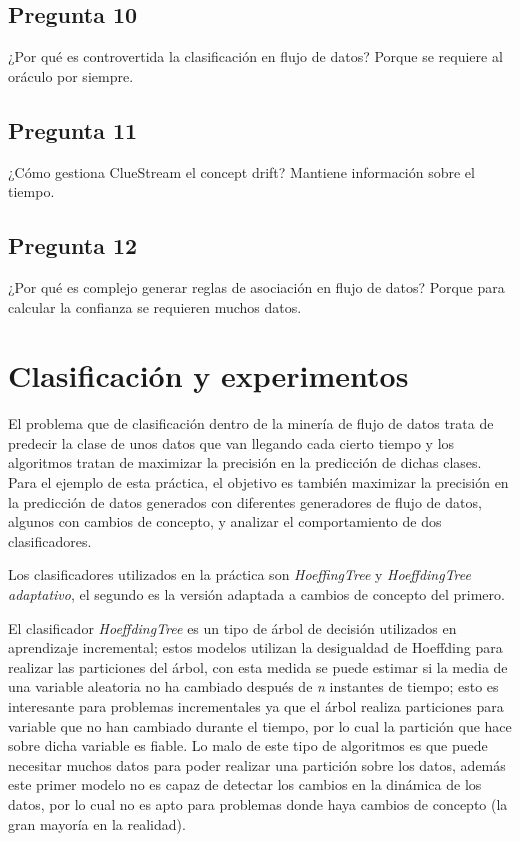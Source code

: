 \subsection{Pregunta 10}
¿Por qué es controvertida la clasificación en flujo de datos? 
Porque se requiere al oráculo por siempre.

\subsection{Pregunta 11}
¿Cómo gestiona ClueStream el concept drift? 
Mantiene información sobre el tiempo.

\subsection{Pregunta 12}
¿Por qué es complejo generar reglas de asociación en flujo de datos?
Porque para calcular la confianza se requieren muchos datos.
\section{Clasificación y experimentos}
El problema que de clasificación dentro de la minería de flujo de datos trata de predecir la clase de unos datos que van llegando cada cierto tiempo y los algoritmos tratan de maximizar la precisión en la predicción de dichas clases. Para el ejemplo de esta práctica, el objetivo es también maximizar la precisión en la predicción de datos generados con diferentes generadores de flujo de datos, algunos con cambios de concepto, y analizar el comportamiento de dos clasificadores.\newline

Los clasificadores utilizados en la práctica son \textit{HoeffingTree} y \textit{HoeffdingTree adaptativo}, el segundo es la versión adaptada a cambios de concepto del primero.\newline

El clasificador \textit{HoeffdingTree} es un tipo de árbol de decisión utilizados en aprendizaje incremental; estos modelos utilizan la desigualdad de Hoeffding para realizar las particiones del árbol, con esta medida se puede estimar si la media de una variable aleatoria no ha cambiado después de \textit{n} instantes de tiempo; esto es interesante para problemas incrementales ya que el árbol realiza particiones para variable que no han cambiado durante el tiempo, por lo cual la partición que hace sobre dicha variable es fiable. Lo malo de este tipo de algoritmos es que puede necesitar muchos datos para poder realizar una partición sobre los datos, además este primer modelo no es capaz de detectar los cambios en la dinámica de los datos, por lo cual no es apto para problemas donde haya cambios de concepto (la gran mayoría en la realidad).


